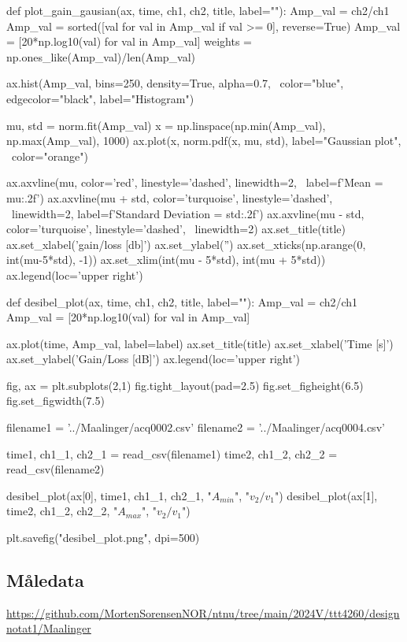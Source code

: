 \begin{pythoncode}
def plot_gain_gausian(ax, time, ch1, ch2, title, label=""):
    Amp_val = ch2/ch1
    Amp_val = sorted([val for val in Amp_val if val >= 0], reverse=True)
    Amp_val = [20*np.log10(val) for val in Amp_val]
    weights = np.ones_like(Amp_val)/len(Amp_val)

    ax.hist(Amp_val, bins=250, density=True, alpha=0.7, \
        color="blue", edgecolor="black", label="Histogram")
    
    mu, std = norm.fit(Amp_val)
    x = np.linspace(np.min(Amp_val), np.max(Amp_val), 1000)
    ax.plot(x, norm.pdf(x, mu, std), label="Gaussian plot", \
        color="orange")

    ax.axvline(mu, color='red', linestyle='dashed', linewidth=2, \
        label=f'Mean = {mu:.2f}')
    ax.axvline(mu + std, color='turquoise', linestyle='dashed', \
        linewidth=2, label=f'Standard Deviation = {std:.2f}')
    ax.axvline(mu - std, color='turquoise', linestyle='dashed', \
        linewidth=2)
    ax.set_title(title)
    ax.set_xlabel('gain/loss [db]')
    ax.set_ylabel('')
    ax.set_xticks(np.arange(0, int(mu-5*std), -1))
    ax.set_xlim(int(mu - 5*std), int(mu + 5*std))
    ax.legend(loc='upper right')

def desibel_plot(ax, time, ch1, ch2, title, label=""):
    Amp_val = ch2/ch1
    Amp_val = [20*np.log10(val) for val in Amp_val]
    
    ax.plot(time, Amp_val, label=label)
    ax.set_title(title)
    ax.set_xlabel('Time [s]')
    ax.set_ylabel('Gain/Loss [dB]')
    ax.legend(loc='upper right')

fig, ax = plt.subplots(2,1)
fig.tight_layout(pad=2.5)
fig.set_figheight(6.5)
fig.set_figwidth(7.5)

filename1 = '../Maalinger/acq0002.csv'
filename2 = '../Maalinger/acq0004.csv'

time1, ch1_1, ch2_1 = read_csv(filename1)
time2, ch1_2, ch2_2 = read_csv(filename2)

desibel_plot(ax[0], time1, ch1_1, ch2_1, "$A_{min}$", "$v_2/v_1$")
desibel_plot(ax[1], time2, ch1_2, ch2_2, "$A_{max}$", "$v_2/v_1$")

plt.savefig("desibel_plot.png", dpi=500) 
\end{pythoncode}

\subsection{Måledata}
\url{https://github.com/MortenSorensenNOR/ntnu/tree/main/2024V/ttt4260/designnotat1/Maalinger}
